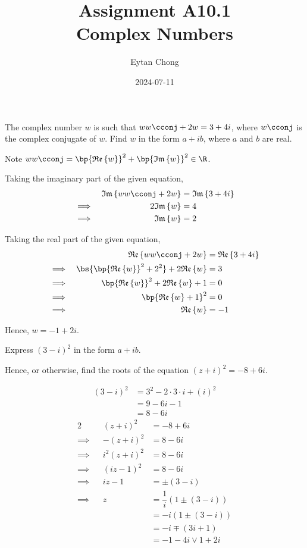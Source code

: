 \documentclass{echw}
\title{Assignment A10.1\\Complex Numbers}
\author{Eytan Chong}
\date{2024-07-11}
\begin{document}
    \problem{}
        The complex number $w$ is such that $w w\cconj + 2w = 3 + 4i$, where $w\cconj$ is the complex conjugate of $w$. Find $w$ in the form $a + ib$, where $a$ and $b$ are real.

    \solution
        Note $w w\cconj = \bp{\Re w}^2 + \bp{\Im w}^2 \in \R$.

        Taking the imaginary part of the given equation,
        \begin{alignat*}{2}
            &&\Im{ww\cconj + 2w} &= \Im{3 + 4i}\\
            \implies&&2 \Im{w} &= 4\\
            \implies&&\Im{w} &= 2
        \end{alignat*}

        Taking the real part of the given equation,
        \begin{alignat*}{2}
            &&\Re{ww\cconj + 2w} &= \Re{3 + 4i}\\
            \implies&&\bs{\bp{\Re w}^2 + 2^2} + 2\Re w &= 3\\
            \implies&& \bp{\Re w}^2 + 2\Re {w} + 1 &= 0\\
            \implies&& \bp{\Re w + 1}^2 &= 0\\
            \implies&& \Re{w} &= -1
        \end{alignat*}

        Hence, $w = -1 + 2i$.


    \problem{}
        Express $(3 - i)^2$ in the form $a + ib$.

        Hence, or otherwise, find the roots of the equation $(z+i)^2 = -8+6i$.

    \solution
        \begin{align*}
            (3 - i)^2 &= 3^2 - 2 \cdot 3 \cdot i + (i)^2\\
            &= 9 - 6i - 1\\
            &= 8 - 6i
        \end{align*}
        \begin{alignat*}{2}
            &&(z+i)^2 &= -8 + 6i\\
            \implies&&-(z + i)^2 &= 8 - 6i\\
            \implies&&i^2 (z + i)^2 &= 8 - 6i\\
            \implies&& (iz - 1)^2 &= 8 - 6i\\
            \implies&& iz - 1 &= \pm (3 - i)\\
            \implies&& z &= \dfrac1i (1 \pm (3 - i))\\
            && &= -i(1 \pm (3 - i))\\
            && &= -i \mp (3i + 1)\\
            && &= -1-4i \lor 1 + 2i
        \end{alignat*}
\end{document}
